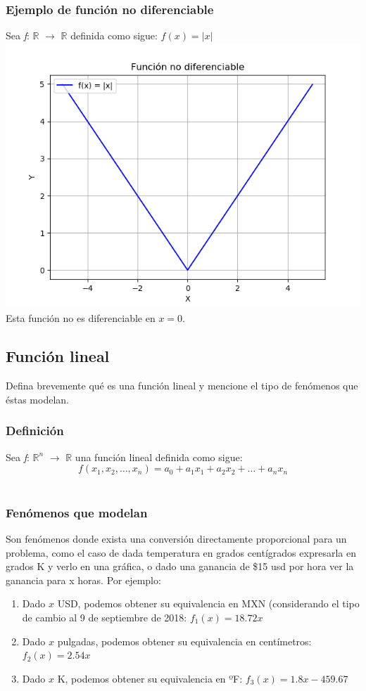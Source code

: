 \documentclass[12pt, letterpaper]{article}
\begin{document}
\subsubsection{Ejemplo de funci\'on no diferenciable}
Sea \textit{f}: $\mathbb{R}$ $\rightarrow$ $\mathbb{R}$ definida como sigue: $f(x) = |x|$ \\
\includegraphics[scale=0.8]{notdiferenciable} \\
Esta funci\'on no es diferenciable en $x=0$.

\subsection{Funci\'on lineal}	
Defina brevemente qu\'e es una funci\'on lineal y mencione el tipo de fen\'omenos que \'estas modelan.
\subsubsection{Definici\'on}
Sea \textit{f}: $\mathbb{R}^n$ $\rightarrow$ $\mathbb{R}$ una función lineal definida como sigue: \\
\[f(x_1,x_2,\dots,x_n) = a_0 + a_1x_1+a_2x_2+\dots+a_nx_n \]\\


\subsubsection{Fenómenos que modelan}
Son fenómenos donde exista una conversión directamente proporcional para un problema, como el caso de dada temperatura en grados centígrados expresarla en grados K y verlo en una gráfica, o dado una ganancia de \$15 usd por hora ver la ganancia para x horas.
Por ejemplo:
\begin{enumerate}
\item Dado $x$ USD, podemos obtener su equivalencia en MXN (considerando el tipo de cambio al 9 de septiembre de 2018: $f_1(x)=18.72x$ 
\item Dado $x$ pulgadas, podemos obtener su equivalencia en centímetros: $f_2(x)=2.54x$ 
\item Dado $x$ K, podemos obtener su equivalencia en ºF: $f_3(x)=1.8x-459.67$ 
\end{enumerate}
\end{document}
